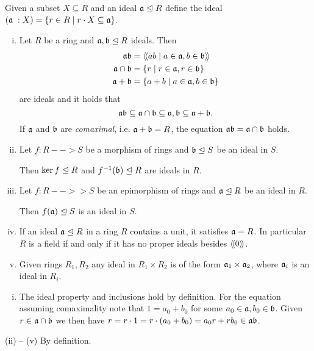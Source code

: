 	Given a subset $X \subseteq R$ and an ideal $\mathfrak{a}\trianglelefteq R$ define the ideal $(\mathfrak{a}\;:X) = \{r \in R \mid r\cdot X \subseteq \mathfrak{a}\}$. 

	\begin{lemma}
		\vspace{-1.5em}\begin{enumerate}[(i)]
			\item{
				Let $R$ be a ring and $\mathfrak{a},\mathfrak{b} \trianglelefteq R$ ideals. Then
				\begin{align*}
					\mathfrak{ab} &= \langle\!\langle ab \mid a \in \mathfrak{a}, b \in \mathfrak{b} \rangle\!\rangle\\
					\mathfrak{a} \cap \mathfrak{b} &= \{r \mid r \in \mathfrak{a}, r \in \mathfrak{b}\}\\
					\mathfrak{a} + \mathfrak{b} &= \{a + b \mid a \in \mathfrak{a}, b \in \mathfrak{b}\}
				\end{align*}
				are ideals and it holds that 
				\begin{equation*}
					\mathfrak{ab} \subseteq \mathfrak{a} \cap \mathfrak{b} \subseteq \mathfrak{a}, \mathfrak{b} \subseteq \mathfrak{a} + \mathfrak{b}.
				\end{equation*}
				If $\mathfrak{a}$ and $\mathfrak{b}$ are \textit{comaximal}, i.e. $\mathfrak{a} + \mathfrak{b} = R$, the equation $\mathfrak{ab} = \mathfrak{a} \cap \mathfrak{b}$ holds.
			}
			\item{
				Let $f:R --> S$ be a morphism of rings and $\mathfrak{b} \trianglelefteq S$ be an ideal in $S$.

				Then $\ker f \trianglelefteq R$ and $f^{-1}(\mathfrak{b}) \trianglelefteq R$ are ideals in $R$.
			}
			\item{
				Let $f:R -->> S$ be an epimorphism of rings and $\mathfrak{a} \trianglelefteq R$ be an ideal in $R$.

				Then $f(\mathfrak{a}) \trianglelefteq S$ is an ideal in $S$.
			}
			\item{
				If an ideal $\mathfrak{a} \trianglelefteq R$ in a ring $R$ contains a unit, it satisfies $\mathfrak{a}=R$. In particular $R$ is a field if and only if it has no proper ideals besides $\langle\!\langle 0 \rangle\!\rangle$.
			}
			\item{
				Given rings $R_1,R_2$ any ideal in $R_1 \times R_2$ is of the form $\mathfrak{a}_1 \times \mathfrak{a}_2$, where $\mathfrak{a}_i$ is an ideal in $R_i$. 
			}
		\end{enumerate}
	\end{lemma}
	\begin{sketch}
		\begin{enumerate}[(i)]
			\item{
				The ideal property and inclusions hold by definition. For the equation assuming comaximality note that $1 = a_0+b_0$ for some $a_0 \in \mathfrak{a}, b_0 \in \mathfrak{b}$. Given $r \in \mathfrak{a}\cap\mathfrak{b}$ we then have $r = r\cdot 1 = r\cdot(a_0+b_0) = a_0r + rb_0 \in \mathfrak{ab}$.
			}
		\end{enumerate}
		\hspace{.15cm}(ii) -- (v) By definition.
	\end{sketch}

